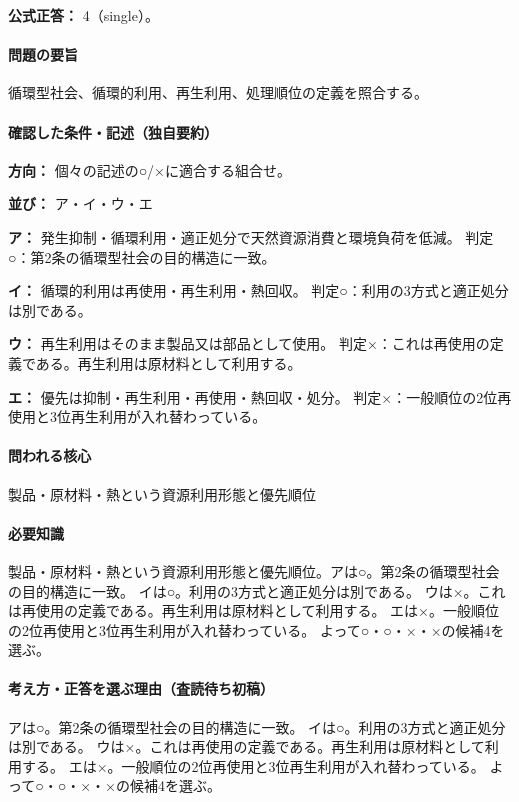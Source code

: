 \textbf{公式正答：} 4（single）。

\paragraph{問題の要旨} 循環型社会、循環的利用、再生利用、処理順位の定義を照合する。

\paragraph{確認した条件・記述（独自要約）}\mbox{}\par

\noindent\textbf{方向：} 個々の記述の○/×に適合する組合せ。\par

\noindent\textbf{並び：} ア・イ・ウ・エ\par

\noindent\textbf{ア：} 発生抑制・循環利用・適正処分で天然資源消費と環境負荷を低減。 判定○：第2条の循環型社会の目的構造に一致。\par

\noindent\textbf{イ：} 循環的利用は再使用・再生利用・熱回収。 判定○：利用の3方式と適正処分は別である。\par

\noindent\textbf{ウ：} 再生利用はそのまま製品又は部品として使用。 判定×：これは再使用の定義である。再生利用は原材料として利用する。\par

\noindent\textbf{エ：} 優先は抑制・再生利用・再使用・熱回収・処分。 判定×：一般順位の2位再使用と3位再生利用が入れ替わっている。\par

\paragraph{問われる核心} 製品・原材料・熱という資源利用形態と優先順位

\paragraph{必要知識} 製品・原材料・熱という資源利用形態と優先順位。アは○。第2条の循環型社会の目的構造に一致。 イは○。利用の3方式と適正処分は別である。 ウは×。これは再使用の定義である。再生利用は原材料として利用する。 エは×。一般順位の2位再使用と3位再生利用が入れ替わっている。 よって○・○・×・×の候補4を選ぶ。

\paragraph{考え方・正答を選ぶ理由（査読待ち初稿）} アは○。第2条の循環型社会の目的構造に一致。 イは○。利用の3方式と適正処分は別である。 ウは×。これは再使用の定義である。再生利用は原材料として利用する。 エは×。一般順位の2位再使用と3位再生利用が入れ替わっている。 よって○・○・×・×の候補4を選ぶ。

